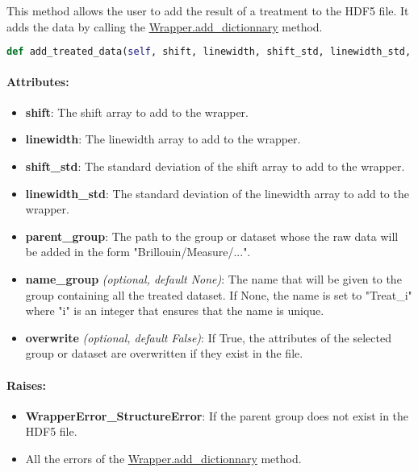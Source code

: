 This method allows the user to add the result of a treatment to the HDF5 file. It adds the data by calling the \hyperref[subsec:wrapper.add_dictionnary]{Wrapper.add\_dictionnary} method.

\begin{lstlisting}[language=Python]
def add_treated_data(self, shift, linewidth, shift_std, linewidth_std, parent_group, name_group = None, overwrite = False):
\end{lstlisting}

\paragraph{Attributes:}

\begin{itemize}
    \item \textbf{shift}: The shift array to add to the wrapper. 
    \item \textbf{linewidth}: The linewidth array to add to the wrapper. 
    \item \textbf{shift\_std}: The standard deviation of the shift array to add to the wrapper. 
    \item \textbf{linewidth\_std}: The standard deviation of the linewidth array to add to the wrapper. 
    \item \textbf{parent\_group}: The path to the group or dataset whose the raw data will be added in the form "Brillouin/Measure/...".
    \item \textbf{name\_group} \textit{(optional, default None)}: The name that will be given to the group containing all the treated dataset. If None, the name is set to "Treat_i" where "i" is an integer that ensures that the name is unique.
    \item \textbf{overwrite} \textit{(optional, default False)}: If True, the attributes of the selected group or dataset are overwritten if they exist in the file.
\end{itemize}

\paragraph{Raises:}
\begin{itemize}
    \item \textbf{WrapperError\_StructureError}: If the parent group does not exist in the HDF5 file.
    \item All the errors of the \hyperref[subsec:wrapper.add_dictionnary]{Wrapper.add\_dictionnary} method.
\end{itemize}
